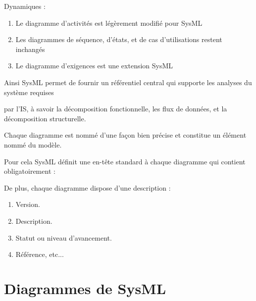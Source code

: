 \documentclass[12pt,a4paper]{report}
\begin{document}
\noindent \begin{flushleft}
	Dynamiques :
\end{flushleft}

\begin{enumerate}
	\item  Le diagramme d'activit\'{e}s est l\'{e}g\`{e}rement modifi\'{e} pour SysML
	
	\item  Les diagrammes de s\'{e}quence, d'\'{e}tats, et de cas d'utilisations restent inchang\'{e}s
	
	\item  Le diagramme d'exigences est une extension SysML
\end{enumerate}

\noindent \begin{flushleft}
	
	
	\noindent 
	
	\noindent Ainsi SysML permet de fournir un r\'{e}f\'{e}rentiel central qui supporte les analyses du syst\`{e}me requises
	
	\noindent par l'IS, \`{a} savoir la d\'{e}composition fonctionnelle, les flux de donn\'{e}es, et la d\'{e}composition structurelle. 
	
	\noindent Chaque diagramme est nomm\'{e} d'une fa\c{c}on bien pr\'{e}cise et constitue un \'{e}l\'{e}ment nomm\'{e} du mod\`{e}le. 
	
	\noindent Pour cela SysML d\'{e}finit une en-t\^{e}te standard \`{a} chaque diagramme qui contient obligatoirement : 
	
	\noindent 
	
	\noindent De plus, chaque diagramme dispose d'une description :
\end{flushleft}

\begin{enumerate}
	\item  Version.
	
	\item  Description.
	
	\item  Statut ou niveau d'avancement.
	
	\item  R\'{e}f\'{e}rence, etc...
\end{enumerate}

\noindent \begin{flushleft}
	
\end{flushleft}


\section{ Diagrammes de SysML}
\end{document}
